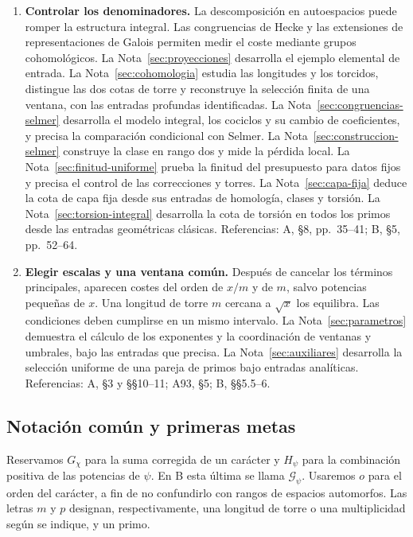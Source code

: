 \begin{enumerate}[label=\textbf{\arabic*.}]
    pendientes, evaluación y correlaciones que producen las cotas del
    marco, con sus entradas geométricas explícitas. Referencias: A, §§5 y 7;
    B, §§4.3--4.5.
  \item \textbf{Controlar los denominadores.}
    La descomposición en autoespacios puede romper la estructura integral.
    Las congruencias de Hecke y las extensiones de representaciones de Galois
    permiten medir el coste mediante grupos cohomológicos. La
    Nota~\ref{sec:proyecciones} desarrolla el ejemplo elemental de entrada.
    La Nota~\ref{sec:cohomologia} estudia las longitudes y los torcidos,
    distingue las dos cotas de torre y reconstruye la selección finita
    de una ventana, con las entradas profundas identificadas.
    La Nota~\ref{sec:congruencias-selmer} desarrolla el modelo integral,
    los cociclos y su cambio de coeficientes, y precisa la comparación
    condicional con Selmer. La Nota~\ref{sec:construccion-selmer}
    construye la clase en rango dos y mide la pérdida local.
    La Nota~\ref{sec:finitud-uniforme} prueba la finitud del presupuesto
    para datos fijos y precisa el control de las correcciones y torres.
    La Nota~\ref{sec:capa-fija} deduce la cota de capa fija desde
    sus entradas de homología, clases y torsión.
    La Nota~\ref{sec:torsion-integral} desarrolla la cota de torsión
    en todos los primos desde las entradas geométricas clásicas.
    Referencias: A, §8, pp.~35--41; B, §5, pp.~52--64.
  \item \textbf{Elegir escalas y una ventana común.}
    Después de cancelar los términos principales, aparecen costes del orden
    de $x/m$ y de $m$, salvo potencias pequeñas de $x$. Una longitud de torre
    $m$ cercana a $\sqrt{x}$ los equilibra. Las condiciones deben cumplirse
    en un mismo intervalo. La Nota~\ref{sec:parametros} demuestra el
    cálculo de los exponentes y la coordinación de ventanas y umbrales,
    bajo las entradas que precisa. La Nota~\ref{sec:auxiliares} desarrolla
    la selección uniforme de una pareja de primos bajo entradas analíticas.
    Referencias: A, §3 y §§10--11; A93, §5; B, §§5.5--6.
\end{enumerate}

\subsection{Notación común y primeras metas}

Reservamos $G_\chi$ para la suma corregida de un carácter y $H_\psi$ para la
combinación positiva de las potencias de $\psi$. En B esta última se llama
$\mathcal G_\psi$. Usaremos $o$ para el orden del carácter, a fin de no
confundirlo con rangos de espacios automorfos. Las letras $m$ y $p$ designan,
respectivamente, una longitud de torre o una multiplicidad según se indique,
y un primo.

